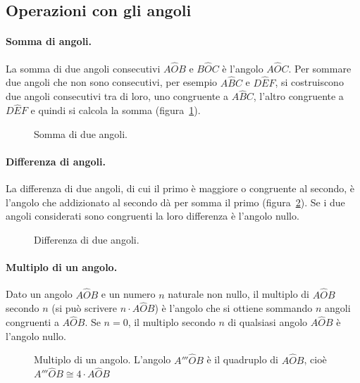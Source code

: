 \subsection{Operazioni con gli angoli}

\paragraph{Somma di angoli.} La somma di due angoli consecutivi $A\widehat{O}B$ e $B\widehat{O}C$ è l'angolo $A\widehat{O}C$. Per sommare due angoli che non sono consecutivi, per esempio $A\widehat{B}C$ e $D\widehat{E}F$, si costruiscono due angoli consecutivi tra di loro, uno congruente a $A\widehat{B}C$, l'altro congruente a $D\widehat{E}F$ e quindi si calcola la somma (figura~\ref{fig:1.32}).

\begin{figure}[htb]
\centering
\caption{Somma di due angoli.}\label{fig:1.32}
\end{figure}

\paragraph{Differenza di angoli.} La differenza di due angoli, di cui il primo è maggiore o congruente al secondo, è l'angolo che addizionato al secondo dà per somma il primo (figura~\ref{fig:1.33}). Se i due angoli considerati sono congruenti la loro differenza è l'angolo nullo.

\begin{figure}[htb]
\centering
\caption{Differenza di due angoli.}\label{fig:1.33}
\end{figure}

\paragraph{Multiplo di un angolo.} Dato un angolo $A\widehat{O}B$ e un numero $n$ naturale non nullo, il multiplo di $A\widehat{O}B$ secondo $n$ (si può scrivere $n\cdot A\widehat{O}B$) è l'angolo che si ottiene sommando $n$ angoli congruenti a $A\widehat{O}B$. Se $n=0$, il multiplo secondo $n$ di qualsiasi angolo $A\widehat{O}B$ è l'angolo nullo.

\begin{figure}[htb]
\centering
\caption{Multiplo di un angolo. L'angolo $A'''\widehat{O}B$ è il quadruplo di $A\widehat{O}B$, cioè $A'''\widehat{O}B \cong 4\cdot A\widehat{O}B$}
\end{figure}

